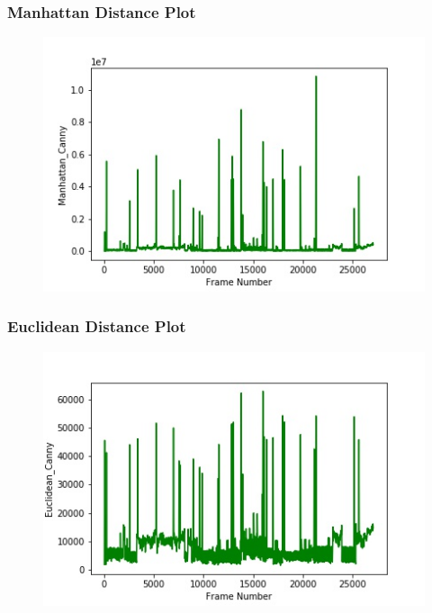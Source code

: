 \documentclass{beamer}
\begin{document}
\begin{frame}
\frametitle{Manhattan Distance Plot}
\begin{figure}[h!]
	\includegraphics[width=\linewidth]{Presentation_Image/Manhattan_Canny.jpeg}
\end{figure}
\end{frame}

\begin{frame}
\frametitle{Euclidean Distance Plot}
\begin{figure}[h!]
	\includegraphics[width=\linewidth]{Presentation_Image/Euclidean_Canny.jpeg}
\end{figure}
\end{frame}
\end{document}
